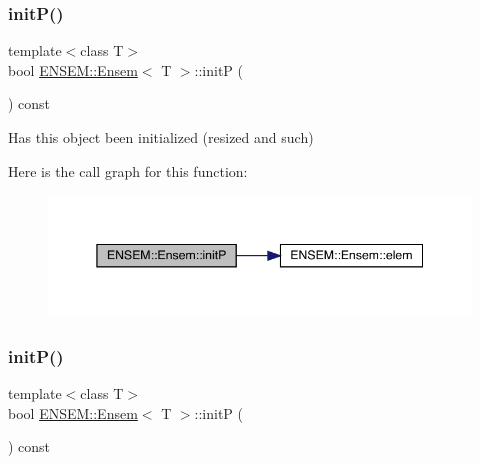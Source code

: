 \mbox{\label{classENSEM_1_1Ensem_af76aaa7b0f354006786dce06dc04669d}} 
\subsubsection{\texorpdfstring{initP()}{initP()}\hspace{0.1cm}{\footnotesize\ttfamily [1/3]}}
{\footnotesize\ttfamily template$<$class T$>$ \\
bool \mbox{\hyperlink{classENSEM_1_1Ensem}{E\+N\+S\+E\+M\+::\+Ensem}}$<$ T $>$\+::initP (\begin{DoxyParamCaption}{ }\end{DoxyParamCaption}) const\hspace{0.3cm}{\ttfamily [inline]}}



Has this object been initialized (resized and such) 

Here is the call graph for this function\+:
\nopagebreak
\begin{figure}[H]
\begin{center}
\leavevmode
\includegraphics[width=345pt]{d7/d3e/classENSEM_1_1Ensem_af76aaa7b0f354006786dce06dc04669d_cgraph}
\end{center}
\end{figure}
\mbox{\label{classENSEM_1_1Ensem_af76aaa7b0f354006786dce06dc04669d}} 
\subsubsection{\texorpdfstring{initP()}{initP()}\hspace{0.1cm}{\footnotesize\ttfamily [2/3]}}
{\footnotesize\ttfamily template$<$class T$>$ \\
bool \mbox{\hyperlink{classENSEM_1_1Ensem}{E\+N\+S\+E\+M\+::\+Ensem}}$<$ T $>$\+::initP (\begin{DoxyParamCaption}{ }\end{DoxyParamCaption}) const\hspace{0.3cm}{\ttfamily [inline]}}



